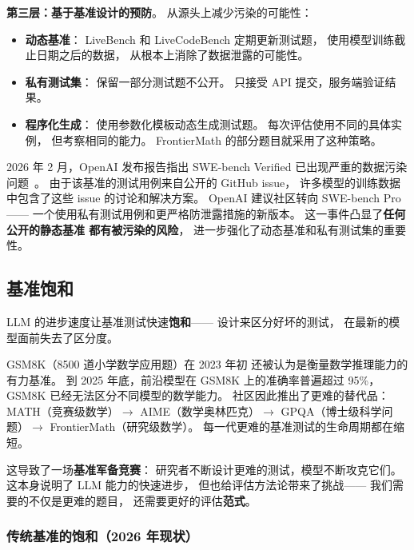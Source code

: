 \textbf{第三层：基于基准设计的预防}。
从源头上减少污染的可能性：
\begin{itemize}[noitemsep]
  \item \textbf{动态基准}：
        LiveBench 和 LiveCodeBench 定期更新测试题，
        使用模型训练截止日期之后的数据，
        从根本上消除了数据泄露的可能性。
  \item \textbf{私有测试集}：
        保留一部分测试题不公开。
        只接受 API 提交，服务端验证结果。
  \item \textbf{程序化生成}：
        使用参数化模板动态生成测试题。
        每次评估使用不同的具体实例，
        但考察相同的能力。
        FrontierMath 的部分题目就采用了这种策略。
\end{itemize}

\begin{warnbox}
2026 年 2 月，OpenAI 发布报告指出
SWE-bench Verified 已出现严重的数据污染问题~\cite{openai2026swebenchpro}。
由于该基准的测试用例来自公开的 GitHub issue，
许多模型的训练数据中包含了这些 issue 的讨论和解决方案。
OpenAI 建议社区转向 SWE-bench Pro——
一个使用私有测试用例和更严格防泄露措施的新版本。
这一事件凸显了\textbf{任何公开的静态基准
都有被污染的风险}，
进一步强化了动态基准和私有测试集的重要性。
\end{warnbox}

\subsection{基准饱和}

LLM 的进步速度让基准测试快速\textbf{饱和}——
设计来区分好坏的测试，
在最新的模型面前失去了区分度。

GSM8K（8500 道小学数学应用题）在 2023 年初
还被认为是衡量数学推理能力的有力基准。
到 2025 年底，前沿模型在 GSM8K 上的准确率普遍超过 95\%，
GSM8K 已经无法区分不同模型的数学能力。
社区因此推出了更难的替代品：
MATH（竞赛级数学）$\to$ AIME（数学奥林匹克）$\to$
GPQA（博士级科学问题）$\to$ FrontierMath（研究级数学）。
每一代更难的基准测试的生命周期都在缩短。

这导致了一场\textbf{基准军备竞赛}：
研究者不断设计更难的测试，模型不断攻克它们。
这本身说明了 LLM 能力的快速进步，
但也给评估方法论带来了挑战——
我们需要的不仅是更难的题目，
还需要更好的评估\textbf{范式}。

\subsubsection{传统基准的饱和（2026 年现状）}

